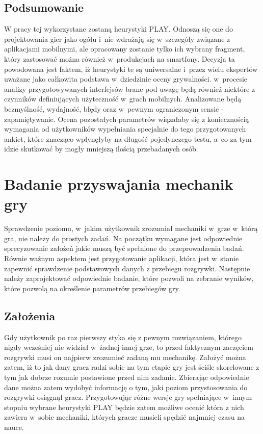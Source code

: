 \documentclass[a4paper,12pt,numbers=noenddot]{report}
\begin{document}
\section{Podsumowanie}
W pracy tej wykorzystane zostaną heurystyki PLAY. Odnoszą się one do projektowania gier jako ogółu i~nie wdrażają się w~szczegóły związane z aplikacjami mobilnymi, ale opracowany zostanie tylko ich wybrany fragment, który zastosować można również w~produkcjach na smartfony. Decyzja ta powodowana jest faktem, iż heurystyki te są uniwersalne i~przez wielu ekspertów uważane jako całkowita podstawa w~dziedzinie oceny grywalności. w~procesie analizy przygotowywanych interfejsów brane pod uwagę będą również niektóre z czynników definiujących użyteczność w~grach mobilnych. Analizowane będą bezmyślność, wydajność, błędy oraz w~pewnym ograniczonym sensie - zapamiętywanie. Ocena pozostałych parametrów wiązałaby się z koniecznością wymagania od użytkowników wypełniania specjalnie do tego przygotowanych ankiet, które znacząco wpłynęłyby na długość pojedynczego testu, a~co za tym idzie skutkować by mogły mniejszą ilością przebadanych osób.

\chapter{Badanie przyswajania mechanik gry}
Sprawdzenie poziomu, w~jakim użytkownik zrozumiał mechaniki w~grze w~którą gra, nie należy do prostych zadań. Na początku wymagane jest odpowiednie sprecyzowanie założeń jakie muszą być spełnione do przeprowadzenia badań. Równie ważnym aspektem jest przygotowanie aplikacji, która jest w~stanie zapewnić sprawdzenie podstawowych danych z przebiegu rozgrywki. Następnie należy zaprojektować odpowiednie badanie, które pozwoli na zebranie wyników, które pozwolą na określenie parametrów przebiegów gry.
\section{Założenia}
Gdy użytkownik po raz pierwszy styka się z pewnym rozwiązaniem, którego nigdy wcześniej nie widział w~żadnej innej grze, to przed faktycznym zaczęciem rozgrywki musi on najpierw zrozumieć zadaną mu mechanikę. Założyć można zatem, iż to jak dany gracz radzi sobie na tym etapie gry jest ściśle skorelowane z tym jak dobrze rozumie postawione przed nim zadanie. Zbierając odpowiednie dane można zatem wydobyć informację o tym, jaki poziom przystosowania do rozgrywki osiągnął gracz. Przygotowując różne wersje gry spełniające w~innym stopniu wybrane heurystyki PLAY będzie zatem możliwe ocenić która z nich zawiera w~sobie mechaniki, których gracze musieli spędzić najmniej czasu na nauce.
\end{document}
